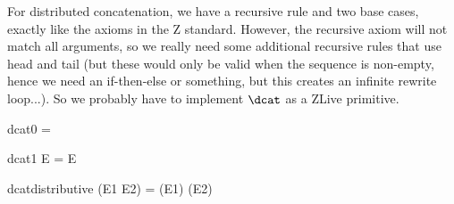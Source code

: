 \documentclass{article}
\begin{document}
For distributed concatenation, we have a recursive rule and
two base cases, exactly like the axioms in the Z standard.
However, the recursive axiom will not match all arguments,
so we really need some additional recursive rules that use 
head and tail (but these would only be valid when the sequence
is non-empty, hence we need an if-then-else or something, but this
creates an infinite rewrite loop...).  So we probably have to
implement $\dcat$ as a ZLive primitive. 
\begin{zedrule}{dcat0}
   \dcat \langle \rangle = \langle \rangle
\end{zedrule}
\begin{zedrule}{dcat1}
   \dcat \langle E \rangle = E
\end{zedrule}
\begin{zedrule}{dcatdistributive}
   \dcat (E1 \cat E2) = (\dcat E1) \cat (\dcat E2)
\end{zedrule}

\end{document}
